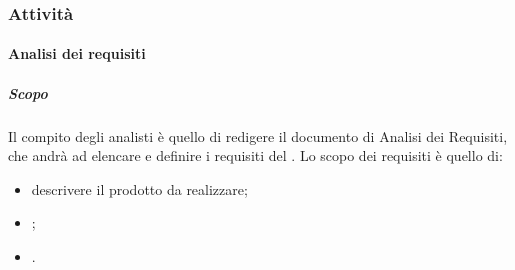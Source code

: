 \documentclass[]{article}
\begin{document}
				\subsubsection{Attività}
					\paragraph{Analisi dei requisiti} %
						\subparagraph{Scopo} %
						Il compito degli analisti è quello di redigere il documento di Analisi dei Requisiti, che andrà ad elencare e definire i requisiti del . Lo scopo dei requisiti è quello di:
						\begin{itemize}
							\item descrivere il prodotto da realizzare;
							\item ;
							\item .
						\end{itemize}
\end{document}
